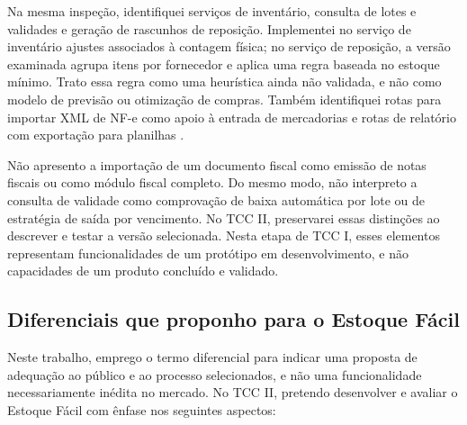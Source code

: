 Na mesma inspeção, identifiquei serviços de inventário, consulta de lotes e validades e geração de rascunhos de reposição. Implementei no serviço de inventário ajustes associados à contagem física; no serviço de reposição, a versão examinada agrupa itens por fornecedor e aplica uma regra baseada no estoque mínimo. Trato essa regra como uma heurística ainda não validada, e não como modelo de previsão ou otimização de compras. Também identifiquei rotas para importar XML de NF-e como apoio à entrada de mercadorias e rotas de relatório com exportação para planilhas \cite{EstoqueFacilRepositorio}.

Não apresento a importação de um documento fiscal como emissão de notas fiscais ou como módulo fiscal completo. Do mesmo modo, não interpreto a consulta de validade como comprovação de baixa automática por lote ou de estratégia de saída por vencimento. No TCC II, preservarei essas distinções ao descrever e testar a versão selecionada. Nesta etapa de TCC I, esses elementos representam funcionalidades de um protótipo em desenvolvimento, e não capacidades de um produto concluído e validado.

\subsection{Diferenciais que proponho para o Estoque Fácil}
\label{sec:diferenciais}

Neste trabalho, emprego o termo diferencial para indicar uma proposta de adequação ao público e ao processo selecionados, e não uma funcionalidade necessariamente inédita no mercado. No TCC II, pretendo desenvolver e avaliar o Estoque Fácil com ênfase nos seguintes aspectos:

